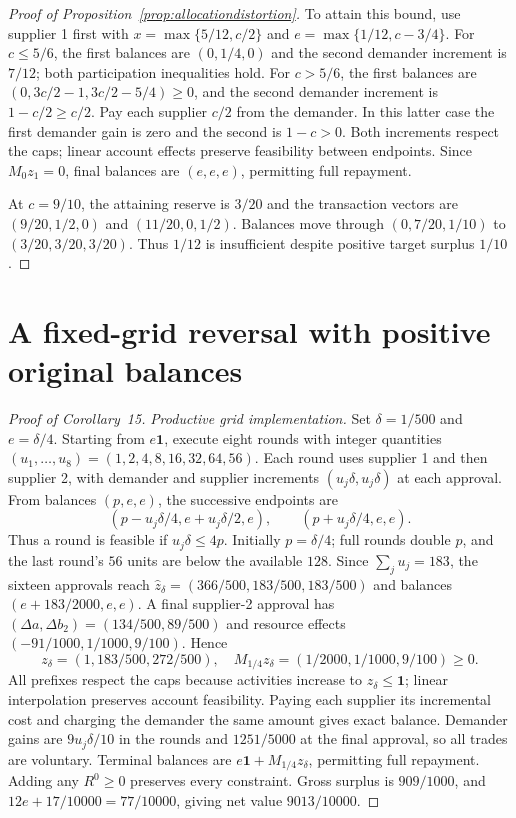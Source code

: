 \documentclass[ecta,draft,supplement]{econsocart}
\theoremstyle{definition}
\theoremstyle{definition}
\begin{document}
\begin{appendix}
\begin{proof}[Proof of Proposition~\ref{prop:allocationdistortion}]
To attain this bound, use supplier 1 first with
$x=\max\{5/12,c/2\}$ and $e=\max\{1/12,c-3/4\}$.
For $c\leq5/6$, the first balances are $(0,1/4,0)$ and
the second demander increment is $7/12$; both participation
inequalities hold. For $c>5/6$, the first balances are
$(0,3c/2-1,3c/2-5/4)\geq0$, and the second demander
increment is $1-c/2\geq c/2$. Pay each supplier $c/2$
from the demander. In this latter case the first demander gain
is zero and the second is $1-c>0$. Both increments respect
the caps; linear account effects preserve feasibility between
endpoints. Since $M_0z_1=0$, final balances are $(e,e,e)$,
permitting full repayment.

At $c=9/10$, the attaining reserve is $3/20$ and the
transaction vectors are $(9/20,1/2,0)$ and $(11/20,0,1/2)$.
Balances move through $(0,7/20,1/10)$ to
$(3/20,3/20,3/20)$. Thus $1/12$ is insufficient despite
positive target surplus $1/10$.
\end{proof}

\section{A fixed-grid reversal with positive original balances}
\label{app:gridrobustreversal}

\begin{proof}[Proof of Corollary~15%
]
\emph{Productive grid implementation.}
Set $\delta=1/500$ and $e=\delta/4$. Starting from $e\mathbf1$,
execute eight rounds with integer quantities
$(u_1,\ldots,u_8)=(1,2,4,8,16,32,64,56)$.
Each round uses supplier 1 and then supplier 2, with demander and
supplier increments $(u_j\delta,u_j\delta)$ at each approval.
From balances $(p,e,e)$, the successive endpoints are
\[
 (p-u_j\delta/4,e+u_j\delta/2,e),
 \qquad(p+u_j\delta/4,e,e).
\]
Thus a round is feasible if $u_j\delta\leq4p$. Initially
$p=\delta/4$; full rounds double $p$, and the last round's
$56$ units are below the available $128$. Since $\sum_j u_j=183$,
the sixteen approvals reach
$\widehat z_\delta=(366/500,183/500,183/500)$ and balances
$(e+183/2000,e,e)$. A final supplier-2 approval has
$(\Delta a,\Delta b_2)=(134/500,89/500)$ and resource effects
$(-91/1000,1/1000,9/100)$. Hence
\[
 z_\delta=(1,183/500,272/500),\quad
 M_{1/4}z_\delta=(1/2000,1/1000,9/100)\geq0.
\]
All prefixes respect the caps because activities increase to
$z_\delta\leq\mathbf1$; linear interpolation preserves account
feasibility. Paying each supplier its incremental cost and charging
the demander the same amount gives exact balance. Demander gains are
$9u_j\delta/10$ in the rounds and $1251/5000$ at the final approval,
so all trades are voluntary. Terminal balances are
$e\mathbf1+M_{1/4}z_\delta$, permitting full repayment. Adding any
$R^0\geq0$ preserves every constraint. Gross surplus is $909/1000$,
and $12e+17/10000=77/10000$, giving net value $9013/10000$.


\end{proof}
\end{appendix}
\end{document}
